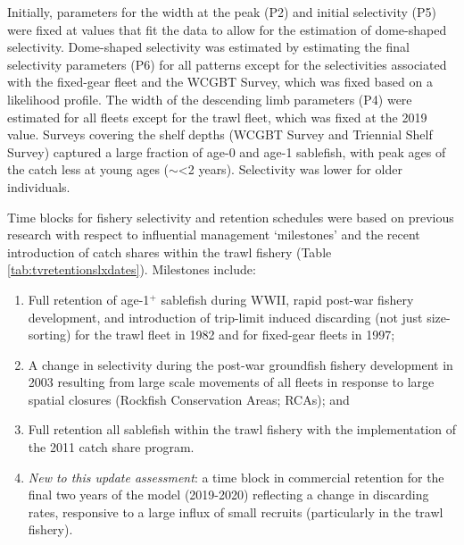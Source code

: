\documentclass[11pt,
  english,
  a4paper,
]{article}
\begin{document}
\leavevmode\tagmcend\tagstructend


Initially, parameters for the width at the peak (P2) and initial selectivity (P5) were fixed at values that fit the data to allow for the estimation of dome-shaped selectivity. Dome-shaped selectivity was estimated by estimating the final selectivity parameters (P6) for all patterns except for the selectivities associated with the fixed-gear fleet and the WCGBT Survey, which was fixed based on a likelihood profile. The width of the descending limb parameters (P4) were estimated for all fleets except for the trawl fleet, which was fixed at the 2019 value. Surveys covering the shelf depths (WCGBT Survey and Triennial Shelf Survey) captured a large fraction of age-0 and age-1 sablefish, with peak ages of the catch less at young ages ({\(\sim\)\leavevmode\tagmcend\tagstructend}\textless 2 years). Selectivity was lower for older individuals.

\leavevmode\tagmcend\tagstructend\par

Time blocks for fishery selectivity and retention schedules were based on previous research with respect to influential management `milestones' and the recent introduction of catch shares within the trawl fishery (Table \ref{tab:tvretentionslxdates}). Milestones include:

\begin{enumerate}
  \item Full retention of age-1$^+$ sablefish during WWII, rapid post-war fishery development, and introduction of trip-limit induced discarding (not just size-sorting) for the trawl fleet in 1982 and for fixed-gear fleets in 1997;
  \item A change in selectivity during the post-war groundfish fishery development in 2003 resulting from large scale movements of all fleets in response to large spatial closures (Rockfish Conservation Areas; RCAs); and
  \item Full retention all sablefish within the trawl fishery with the implementation of the 2011 catch share program.
  \item \textit{New to this update assessment}: a time block in commercial retention for the final two years of the model (2019-2020) reflecting a change in discarding rates, responsive to a large influx of small recruits (particularly in the trawl fishery).
\end{enumerate}
\end{document}
